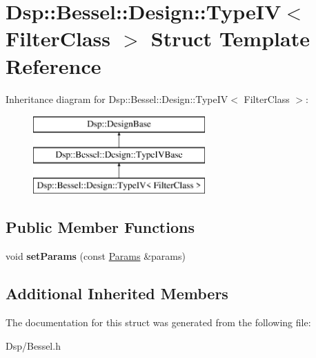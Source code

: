 \hypertarget{structDsp_1_1Bessel_1_1Design_1_1TypeIV}{\section{Dsp\-:\-:Bessel\-:\-:Design\-:\-:Type\-I\-V$<$ Filter\-Class $>$ Struct Template Reference}
\label{structDsp_1_1Bessel_1_1Design_1_1TypeIV}
}
Inheritance diagram for Dsp\-:\-:Bessel\-:\-:Design\-:\-:Type\-I\-V$<$ Filter\-Class $>$\-:\begin{figure}[H]
\begin{center}
\leavevmode
\includegraphics[height=3.000000cm]{structDsp_1_1Bessel_1_1Design_1_1TypeIV}
\end{center}
\end{figure}
\subsection*{Public Member Functions}
\begin{DoxyCompactItemize}
\item 
\hypertarget{structDsp_1_1Bessel_1_1Design_1_1TypeIV_a34a3b1b32c993cdb42ab7d3ccb7f8a9d}{void {\bfseries set\-Params} (const \hyperlink{structDsp_1_1Params}{Params} \&params)}\label{structDsp_1_1Bessel_1_1Design_1_1TypeIV_a34a3b1b32c993cdb42ab7d3ccb7f8a9d}

\end{DoxyCompactItemize}
\subsection*{Additional Inherited Members}


The documentation for this struct was generated from the following file\-:\begin{DoxyCompactItemize}
\item 
Dsp/Bessel.\-h\end{DoxyCompactItemize}
